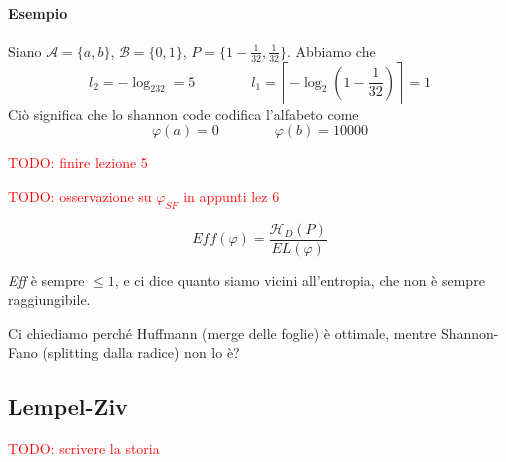 \paragraph{Esempio} Siano $\mathcal{A}=\{a,b\}$, $\mathcal{B}=\{0,1\}$, $P=\{1-\frac{1}{32},\frac{1}{32}\}$. Abbiamo che
$$
    l_2 = -\log_232 = 5 \qquad\qquad l_1 = \left\lceil -\log_2\left(1-\frac{1}{32}\right)\right\rceil = 1
$$
Ciò significa che lo shannon code codifica l'alfabeto come
$$
    \varphi(a) = 0 \qquad\qquad \varphi(b) = 10000
$$
\begin{center}
\end{center}



\textcolor{Red}{TODO: finire lezione 5}

\textcolor{Red}{TODO: osservazione su $\varphi_{SF}$ in appunti lez 6}


\begin{definition}
    $$
        Eff(\varphi) = \frac{\mathcal{H}_D(P)}{EL(\varphi)}
    $$
\end{definition}
\emph{Eff} è sempre $\leq 1$, e ci dice quanto siamo vicini all'entropia, che non è sempre raggiungibile.\medskip

Ci chiediamo perché Huffmann (merge delle foglie) è ottimale, mentre Shannon-Fano (splitting dalla radice) non lo è?


\subsection{Lempel-Ziv}
\textcolor{Red}{TODO: scrivere la storia}


